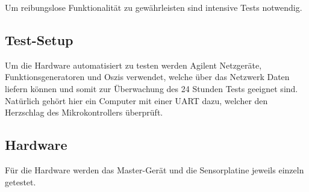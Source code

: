 Um reibungslose Funktionalit\"at zu gew\"ahrleisten sind intensive Tests notwendig.




\subsection{Test-Setup}

Um  die   Hardware  automatisiert  zu  testen   werden  Agilent  Netzger\"ate,
Funktionsgeneratoren  und Oszis  verwendet, welche  \"uber das  Netzwerk Daten
liefern k\"onnen  und somit  zur \"Uberwachung des  24 Stunden  Tests geeignet
sind. Nat\"urlich geh\"ort hier ein Computer  mit einer UART dazu, welcher den
Herzschlag des Mikrokontrollers \"uberpr\"uft.

\subsection{Hardware}

F\"ur die  Hardware werden  das Master-Ger\"at  und die  Sensorplatine jeweils
einzeln getestet.


